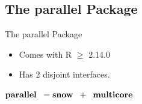 

\subsection{The parallel Package}
\makesubcontentsslidessec

\begin{frame}
  \begin{block}{The parallel Package}
    \begin{itemize}
      \item Comes with R $\geq$ 2.14.0
      \item Has 2 disjoint interfaces.
    \end{itemize}
    \begin{center}
      $\textbf{parallel} \hspace{.2cm} = \textbf{snow} \hspace{.2cm} +
      \hspace{.2cm} \textbf{multicore}$
    \end{center}

  \end{block}
\end{frame}




